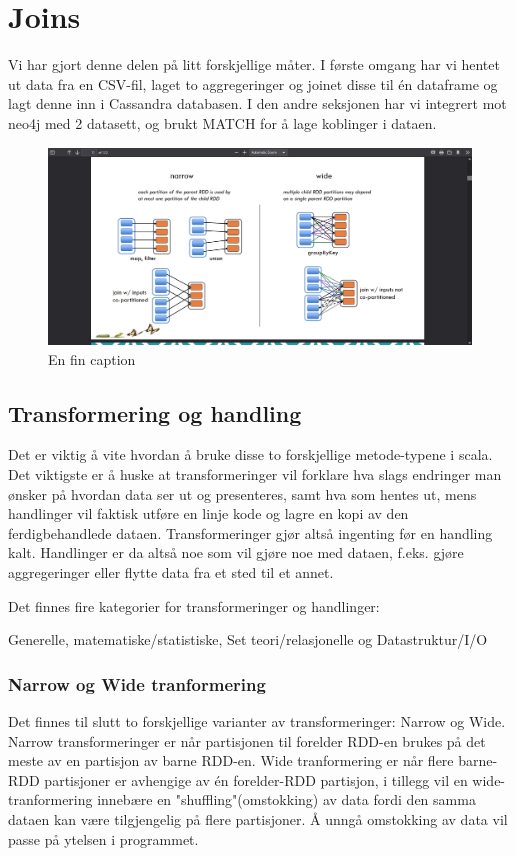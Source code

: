 \section{Joins}
Vi har gjort denne delen på litt forskjellige måter. I første omgang har vi hentet ut data fra en CSV-fil, laget to aggregeringer og joinet disse til én dataframe og lagt denne inn i Cassandra databasen. I den andre seksjonen har vi integrert mot neo4j med 2 datasett, og brukt MATCH for å lage koblinger i dataen.

\begin{figure}[H]
    \centering
    \includegraphics[scale=0.5]{images/transformActionPic.png}
    \caption{En fin caption}
  \end{figure}

\subsection{Transformering og handling}
Det er viktig å vite hvordan å bruke disse to forskjellige metode-typene i scala. Det viktigste er å huske at transformeringer vil forklare hva slags endringer man ønsker på hvordan data ser ut og presenteres, samt hva som hentes ut, mens handlinger vil faktisk utføre en linje kode og lagre en kopi av den ferdigbehandlede dataen. Transformeringer gjør altså ingenting før en handling kalt. Handlinger er da altså noe som vil gjøre noe med dataen, f.eks. gjøre aggregeringer eller flytte data fra et sted til et annet. 


Det finnes fire kategorier for transformeringer og handlinger:


Generelle, matematiske/statistiske, Set teori/relasjonelle og Datastruktur/I/O


\subsubsection{Narrow og Wide tranformering}
Det finnes til slutt to forskjellige varianter av transformeringer: Narrow og Wide. Narrow transformeringer er når partisjonen til forelder RDD-en brukes på det meste av en partisjon av barne RDD-en. Wide tranformering er når flere barne-RDD partisjoner er avhengige av én forelder-RDD partisjon, i tillegg vil en wide-tranformering innebære en "shuffling"(omstokking) av data fordi den samma dataen kan være tilgjengelig på flere partisjoner. Å unngå omstokking av data vil passe på ytelsen i programmet.


